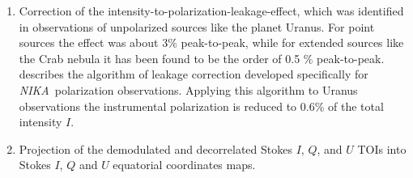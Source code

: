\documentclass[twocolumn,traditabstract]{aa}
\def\NIKA{\textit{NIKA}}
\begin{document}
\begin{enumerate}

\item Correction of the intensity-to-polarization-leakage-effect, which was
  identified in observations of unpolarized sources like the planet Uranus. For
  point sources the effect was about 3\% peak-to-peak, while for extended sources like the Crab nebula it has been found to be the order of 0.5 \% peak-to-peak. 
  \cite{ritacco2017} describes the algorithm of leakage correction developed specifically for \NIKA\ polarization observations. Applying this algorithm to Uranus observations the instrumental polarization is reduced to 0.6\% of the total intensity $I$.
  \item Projection of the demodulated and decorrelated Stokes $I$, $Q$, and $U$ TOIs into Stokes $I$, $Q$ and $U$ equatorial coordinates maps.




\end{enumerate}
\end{document}
